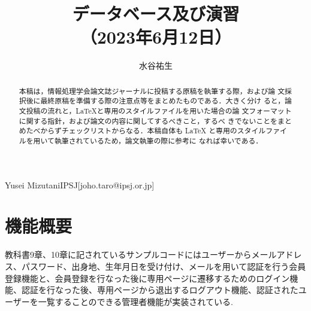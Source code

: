 \documentclass[submit,techrep]{ipsj}
\begin{document}
\title{データベース及び演習\\
（2023年6月12日）}





\author{水谷祐生}{Yusei Mizutani}{IPSJ}[joho.taro@ipsj.or.jp]

\begin{abstract}
本稿は，情報処理学会論文誌ジャーナルに投稿する原稿を執筆する際，および論
文採択後に最終原稿を準備する際の注意点等をまとめたものである．大きく分け
ると，論文投稿の流れと，\LaTeX と専用のスタイルファイルを用いた場合の論
文フォーマットに関する指針，および論文の内容に関してするべきこと，するべ
きでないことをまとめたべからずチェックリストからなる．本稿自体も \LaTeX 
と専用のスタイルファイルを用いて執筆されているため，論文執筆の際に参考に
なれば幸いである．
\end{abstract}

%
%
%

\maketitle

\section{機能概要}

教科書9章、10章に記されているサンプルコードにはユーザーからメールアドレス、パスワード、出身地、生年月日を受け付け、メールを用いて認証を行う会員登録機能と、会員登録を行なった後に専用ページに遷移するためのログイン機能、認証を行なった後、専用ページから退出するログアウト機能、認証されたユーザーを一覧することのできる管理者機能が実装されている.
\end{document}
